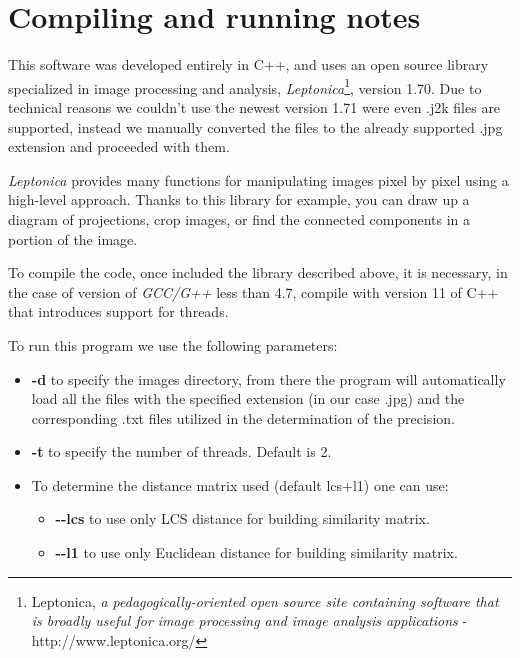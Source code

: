 \section{Compiling and running notes}

This software was developed entirely in C++, and uses an open source library specialized in image processing and analysis, \emph{Leptonica}\footnote{Leptonica, \emph{a pedagogically-oriented open source site containing software that is broadly useful for image processing and image analysis applications} -http://www.leptonica.org/}, version 1.70.
Due to technical reasons we couldn't use the newest version 1.71 were even .j2k files are supported, instead we manually converted the files to the already supported .jpg extension and proceeded with them. 

\emph{Leptonica} provides many functions for manipulating images pixel by pixel using a high-level approach. Thanks to this library for example, you can draw up a diagram of projections, crop images, or find the connected components in a portion of the image.

To compile the code, once included the library described above, it is necessary, in the case of version of \emph{GCC/G++} less than 4.7, compile with version 11 of C++ that introduces support for threads.

To run this program we use the following parameters:
\begin{itemize}
\item \textbf{-d} to specify the images directory, from there the program will automatically load all the files with the specified extension (in our case .jpg) and the corresponding .txt files utilized in the determination of the precision.
\item \textbf{-t} to specify the number of threads. Default is 2.
\item To determine the distance matrix used (default lcs+l1) one can use:
\begin{itemize}
\item \textbf{-\--lcs} to use only LCS distance for building similarity matrix.
\item \textbf{-\--l1} to use only Euclidean distance for building similarity matrix.
\end{itemize}
\end{itemize}